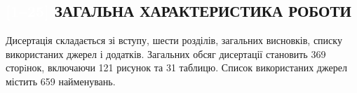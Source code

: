 

\begin{center}
\section*{
\textcolor{white}{[1--25]}
\MakeUppercase{Загальна характеристика роботи}
\textcolor{white}
{\cite{Olikh2018JAP,Olikh2018SM,Olikh:Ultras2016,Olikh2016JSem,
Olikh:Rev,OlikhJAP,Olikh:Ultras,Olikh:UPJ2014,
Olikh:2013IEEE,Olikh:SEMT2013,Olikh:FTP2013,Olikh:UPJ2013,
Olikh:FTP2011,Olikh:SEMT2011,Olikh:UPJ2010,Gorb2010,Olikh:FTP2009,
Olikh:SEMT2007,Olikh:MRS2007a,Olikh:PZTF2006,
Olikh:PhChOM2005,Olikh:PJE2004,Olikh:SEMT2004,Olikh:SPQEO2003,
Olikh:Visn2003,
1UNCPS,3Tomsk,1SEMST,50IUFFC,9APTTE,2005IUS,ICU2007SC,ICU2007GA,2007MRS,3UNCPS,6DrogGorb,6Drog,
4UNCPS,2009DRIP13,4Kremen,7Drog,5UNCPS,2012Ternop,14Plivk,8Drog,2013Buk,6UNCPS,2014IUSOl,2014IUS,6SEMST,
2015ICU,6CPFCS,7UNCPS,2017MEICS}}
}
\end{center}




{\structureTXT}
Дисертація складається зі вступу, шести розділів, загальних висновків, списку використаних джерел і додатків.
Загальних обсяг дисертації становить
369 сторiнок, включаючи 121 рисунок та 31 таблицю.
Список використаних джерел містить 659 найменувань.

